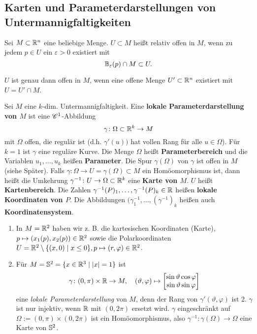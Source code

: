 \subsection{Karten und Parameterdarstellungen von Untermannigfaltigkeiten}
Sei $M \subset \R^n$ eine beliebige Menge. $U \subset M$ heißt relativ offen in $M$, wenn zu jedem $p \in U$ ein $\varepsilon > 0$ existiert mit
\[\B_\varepsilon(p) \cap M \subset U.\]
\begin{lem}
	$U$ ist genau dann offen in $M$, wenn eine offene Menge $U' \subset \R^n$ existiert mit $U = U' \cap M$.
\end{lem}
Sei $M$ eine $k$-dim. Untermannigfaltigkeit. Eine \textbf{lokale Parameterdarstellung von $M$} ist eine $\CF^1$-Abbildung
\[\gamma \colon \Omega \subset \R^k \to M\]
mit $\Omega$ offen, die regulär ist (d.h. $\gamma'(u))$ hat vollen Rang für alle $u \in \Omega$). Für $k=1$ ist $\gamma$ eine reguläre Kurve. Die Menge $\Omega$ heißt \textbf{Parameterbereich} und die Variablen $u_1, \dots, u_k$ heißen \textbf{Parameter}. Die Spur $\gamma(\Omega)$ von $\gamma$ ist offen in $M$ (siehe Später). Falls $\gamma \colon \Omega \to U = \gamma(\Omega) \subset M$ ein Homöomorphismus ist, dann heißt die Umkehrung $\gamma^{-1} \colon U \to \Omega \subset \R^k$ eine \textbf{Karte von $M$}. $U$ heißt \textbf{Kartenbereich}. Die Zahlen $\gamma^{-1}(P)_1, \dots, \gamma^{-1}(P)_k \in \R$ heißen \textbf{lokale Koordinaten von $P$}. Die Abbildungen $(\gamma^{-1}_1, \dots, (\gamma^{-1})_k$ heißen auch \textbf{Koordinatensystem}.
\begin{beispiel}
	\begin{enumerate}
		\item In $M = \R^2$ haben wir z. B. die kartesischen Koordinaten (Karte), $p \mapsto (x_1(p), x_2(p)) \in \R^2$ sowie die Polarkoordinaten $U = \R^2 \setminus \{(x,0) \mid x \leq 0\}, p \mapsto (r, \varphi) \in \R^2$.
		
		\item Für $M = \S^2 = \{x \in \R^3 \mid |x| = 1\}$ ist 
		\[\gamma \colon (0,\pi) \times \R \to M, \quad (\vartheta, \varphi) \mapsto \begin{bmatrix}
			\sin\vartheta\cos\varphi\\
			\sin\vartheta\sin\varphi
		\end{bmatrix}\]
		eine \textit{lokale Parameterdarstellung} von $M$, denn der Rang von $\gamma'(\vartheta, \varphi)$ ist 2. $\gamma$ ist nur injektiv, wenn $\R$ mit $(0,2\pi)$ ersetzt wird. $\gamma$ eingeschränkt auf $\Omega := (0, \pi) \times (0,2\pi)$ ist ein Homöomorphismus, also $\gamma^{-1} \colon \gamma(\Omega) \to \Omega$ eine Karte von $\S^2$.
	\end{enumerate}
\end{beispiel}
